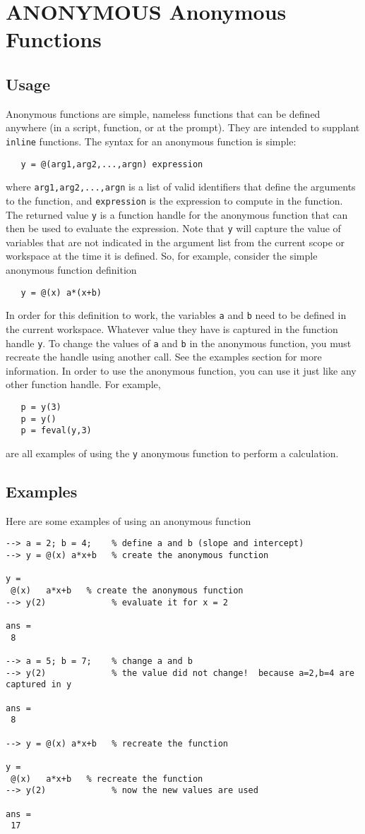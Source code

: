 \section{ANONYMOUS Anonymous Functions}

\subsection{Usage}

Anonymous functions are simple, nameless functions that can be defined
anywhere (in a script, function, or at the prompt).  They are intended
to supplant \verb|inline| functions.  The syntax for an anonymous function
is simple:
\begin{verbatim}
   y = @(arg1,arg2,...,argn) expression
\end{verbatim}
where \verb|arg1,arg2,...,argn| is a list of valid identifiers that define
the arguments to the function, and \verb|expression| is the expression to
compute in the function.  The returned value \verb|y| is a function handle
for the anonymous function that can then be used to evaluate the expression.
Note that \verb|y| will capture the value of variables that are not indicated
in the argument list from the current scope or workspace at the time
it is defined.  So, for example, consider the simple anonymous function
definition
\begin{verbatim}
   y = @(x) a*(x+b)
\end{verbatim}
In order for this definition to work, the variables \verb|a| and \verb|b| need to
be defined in the current workspace.  Whatever value they have is captured
in the function handle \verb|y|.  To change the values of \verb|a| and \verb|b| in the
anonymous function, you must recreate the handle using another call.  See
the examples section for more information.  In order to use the anonymous
function, you can use it just like any other function handle.  For example,
\begin{verbatim}
   p = y(3)
   p = y()
   p = feval(y,3)
\end{verbatim}
are all examples of using the \verb|y| anonymous function to perform a calculation.
\subsection{Examples}

Here are some examples of using an anonymous function
\begin{verbatim}
--> a = 2; b = 4;    % define a and b (slope and intercept)
--> y = @(x) a*x+b   % create the anonymous function

y = 
 @(x)   a*x+b   % create the anonymous function
--> y(2)             % evaluate it for x = 2

ans = 
 8 

--> a = 5; b = 7;    % change a and b
--> y(2)             % the value did not change!  because a=2,b=4 are captured in y

ans = 
 8 

--> y = @(x) a*x+b   % recreate the function

y = 
 @(x)   a*x+b   % recreate the function
--> y(2)             % now the new values are used

ans = 
 17 
\end{verbatim}
